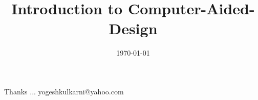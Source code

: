 \documentclass[t,pdf]{beamer}
\title[Intro to CAD \hspace{4cm} \insertframenumber /\inserttotalframenumber]{Introduction to Computer-Aided-Design}
\subtitle[]{}
\date[2014]{\today}
\begin{document}
\begin{frame}
\titlepage
\end{frame}





%
%
%
%
%

%
%

\begin{frame}[c]{}
Thanks ...
\vspace{5mm}
yogeshkulkarni@yahoo.com
\end{frame}


\end{document}
